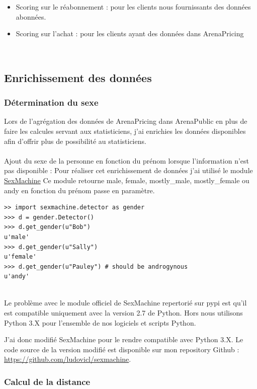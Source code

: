 \begin{itemize}
  \item[\textbullet] Scoring sur le réabonnement : pour les clients nous fournissants des données abonnées. 
  \item[\textbullet] Scoring sur l'achat : pour les clients ayant des données dans ArenaPricing  \end{itemize} \

\subsection{Enrichissement des données}
\subsubsection{Détermination du sexe}

Lors de l'agrégation des données de ArenaPricing dans ArenaPublic en plus de faire les calcules servant aux statisticiens, j'ai enrichies les données disponibles afin d'offrir plus de possibilité au statisticiens.
\\ \\
Ajout du sexe de la personne en fonction du prénom lorsque l'information n'est pas disponible :
Pour réaliser cet enrichissement de données j'ai utilisé le module 
\href{https://github.com/ferhatelmas/sexmachine/}{SexMachine}
Ce module retourne male, female, mostly\_male, mostly\_female ou andy en fonction du prénom passe en paramètre.

\lstset{style=custompython}
\begin{lstlisting}
>> import sexmachine.detector as gender
>>> d = gender.Detector()
>>> d.get_gender(u"Bob")
u'male'
>>> d.get_gender(u"Sally")
u'female'
>>> d.get_gender(u"Pauley") # should be androgynous
u'andy'
\end{lstlisting}
\leavevmode \\
Le problème avec le module officiel de SexMachine repertorié sur pypi est qu'il est compatible uniquement avec la version 2.7 de Python. Hors nous utilisons Python 3.X pour l'ensemble de nos logiciels et scripts Python. 

J'ai donc modifié SexMachine pour le rendre compatible avec Python 3.X. Le code source de la version modifié est disponible sur mon repository Github : \href{https://github.com/ludovicl/sexmachine}{https://github.com/ludovicl/sexmachine}.

\subsubsection{Calcul de la distance}

